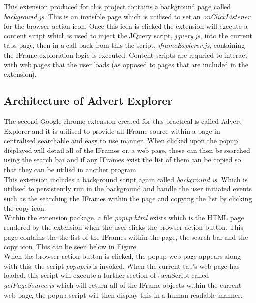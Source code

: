 \documentclass[12pt]{article}
\begin{document}
This extension produced for this project contains a background page called \textit{background.js}. This is an invisible page which is utilised to set an \textit{onClickListener} for the browser action icon. Once this icon is clicked the extension will execute a content script which is used to inject the JQuery script, \textit{jquery.js}, into the current tabs page, then in a call back from this the script, \textit{iframeExplorer.js}, containing the IFrame exploration logic is executed. Content scripts are requried to interact with web pages that the user loads (as opposed to pages that are included in the extension).

\subsection{Architecture of Advert Explorer}
The second Google chrome extension created for this practical is called Advert Explorer and it is utilised to provide all IFrame source within a page in centralised searchable and easy to use manner. When clicked upon the popup displayed will detail all of the IFrames on a web page, these can then be searched using the search bar and if any IFrames exist the list of them can be copied so that they can be utilisd in another program. \\

This extension includes a background script again called \textit{background.js}. Which is utilised to persistently run in the background and handle the user initiated events such as the searching the IFrames within the page and copying the list by clicking the copy icon. \\

Within the extension package, a file \textit{popup.html} exists which is the HTML page rendered by the extension when the user clicks the browser action button. This page contains the the list of the IFrames within the page, the search bar and the copy icon. This can be seen below in Figure. \\ 
When the browser action button is clicked, the popup web-page appears along with this, the script \textit{popup.js} is invoked. When the current tab's web-page has loaded, this script will execute a further section of JavaScript called \textit{getPageSource.js} which will return all of the IFrame objects within the current web-page, the popup script will then display this in a human readable manner. \\ 
\end{document}
